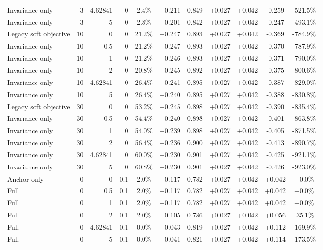 \begin{table}[htbp]
\begin{tabular}{lrrrccccccc}
Invariance only & 3 & 4.62841 & 0 & 2.4\% & +0.211 & 0.849 & +0.027 & +0.042 & -0.259 & -521.5\% \\
Invariance only & 3 & 5 & 0 & 2.8\% & +0.201 & 0.842 & +0.027 & +0.042 & -0.247 & -493.1\% \\
Legacy soft objective & 10 & 0 & 0 & 21.2\% & +0.247 & 0.893 & +0.027 & +0.042 & -0.369 & -784.9\% \\
Invariance only & 10 & 0.5 & 0 & 21.2\% & +0.247 & 0.893 & +0.027 & +0.042 & -0.370 & -787.9\% \\
Invariance only & 10 & 1 & 0 & 21.2\% & +0.246 & 0.893 & +0.027 & +0.042 & -0.371 & -790.0\% \\
Invariance only & 10 & 2 & 0 & 20.8\% & +0.245 & 0.892 & +0.027 & +0.042 & -0.375 & -800.6\% \\
Invariance only & 10 & 4.62841 & 0 & 26.4\% & +0.241 & 0.895 & +0.027 & +0.042 & -0.387 & -829.0\% \\
Invariance only & 10 & 5 & 0 & 26.4\% & +0.240 & 0.895 & +0.027 & +0.042 & -0.388 & -830.8\% \\
Legacy soft objective & 30 & 0 & 0 & 53.2\% & +0.245 & 0.898 & +0.027 & +0.042 & -0.390 & -835.4\% \\
Invariance only & 30 & 0.5 & 0 & 54.4\% & +0.240 & 0.898 & +0.027 & +0.042 & -0.401 & -863.8\% \\
Invariance only & 30 & 1 & 0 & 54.0\% & +0.239 & 0.898 & +0.027 & +0.042 & -0.405 & -871.5\% \\
Invariance only & 30 & 2 & 0 & 56.4\% & +0.236 & 0.900 & +0.027 & +0.042 & -0.413 & -890.7\% \\
Invariance only & 30 & 4.62841 & 0 & 60.0\% & +0.230 & 0.901 & +0.027 & +0.042 & -0.425 & -921.1\% \\
Invariance only & 30 & 5 & 0 & 60.8\% & +0.230 & 0.901 & +0.027 & +0.042 & -0.426 & -923.0\% \\
Anchor only & 0 & 0 & 0.1 & 2.0\% & +0.117 & 0.782 & +0.027 & +0.042 & +0.042 & +0.0\% \\
Full & 0 & 0.5 & 0.1 & 2.0\% & +0.117 & 0.782 & +0.027 & +0.042 & +0.042 & +0.0\% \\
Full & 0 & 1 & 0.1 & 2.0\% & +0.117 & 0.782 & +0.027 & +0.042 & +0.042 & +0.0\% \\
Full & 0 & 2 & 0.1 & 2.0\% & +0.105 & 0.786 & +0.027 & +0.042 & +0.056 & -35.1\% \\
Full & 0 & 4.62841 & 0.1 & 0.0\% & +0.043 & 0.819 & +0.027 & +0.042 & +0.112 & -169.9\% \\
Full & 0 & 5 & 0.1 & 0.0\% & +0.041 & 0.821 & +0.027 & +0.042 & +0.114 & -173.5\% \\

\end{tabular}
\end{table}
